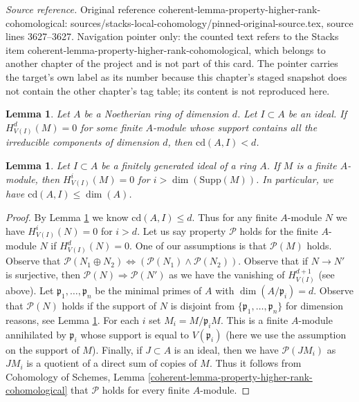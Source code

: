 \documentclass[10pt,a4paper]{amsart}
\theoremstyle{plain}
\newtheorem{lemma}[subsection]{Lemma}
\theoremstyle{definition}
\theoremstyle{remark}
\numberwithin{equation}{subsection}
\begin{document}
\noindent\textit{Source reference.} Original reference coherent-lemma-property-higher-rank-cohomological: sources/stacks-local-cohomology/pinned-original-source.tex, source lines 3627--3627. Navigation pointer only: the counted text refers to the Stacks item coherent-lemma-property-higher-rank-cohomological, which belongs to another chapter of the project and is not part of this card. The pointer carries the target's own label as its number because this chapter's staged snapshot does not contain the other chapter's tag table; its content is not reproduced here.\par\medskip
\begin{lemma}
\label{lemma-cd-top-vanishing-some-module}
Let $A$ be a Noetherian ring of dimension $d$. Let $I \subset A$
be an ideal. If $H^d_{V(I)}(M) = 0$ for some finite $A$-module
whose support contains all the irreducible components of
dimension $d$, then $\text{cd}(A, I) < d$.
\end{lemma}

\begin{lemma}
\label{lemma-cd-dimension}
Let $I \subset A$ be a finitely generated ideal of a ring $A$.
If $M$ is a finite $A$-module, then
$H^i_{V(I)}(M) = 0$ for $i > \dim(\text{Supp}(M))$.
In particular, we have $\text{cd}(A, I) \leq \dim(A)$.
\end{lemma}

\begin{proof}
By Lemma \ref{lemma-cd-dimension} we know $\text{cd}(A, I) \leq d$.
Thus for any finite $A$-module $N$ we have $H^i_{V(I)}(N) = 0$
for $i > d$. Let us say property $\mathcal{P}$ holds for the
finite $A$-module $N$ if $H^d_{V(I)}(N) = 0$.
One of our assumptions is that $\mathcal{P}(M)$ holds.
Observe that $\mathcal{P}(N_1 \oplus N_2)
\Leftrightarrow (\mathcal{P}(N_1) \wedge \mathcal{P}(N_2))$.
Observe that if $N \to N'$ is surjective, then
$\mathcal{P}(N) \Rightarrow \mathcal{P}(N')$ as we
have the vanishing of $H^{d + 1}_{V(I)}$ (see above).
Let $\mathfrak p_1, \ldots, \mathfrak p_n$ be the
minimal primes of $A$ with $\dim(A/\mathfrak p_i) = d$.
Observe that $\mathcal{P}(N)$ holds if the support
of $N$ is disjoint from $\{\mathfrak p_1, \ldots, \mathfrak p_n\}$
for dimension reasons, see Lemma \ref{lemma-cd-dimension}.
For each $i$ set $M_i = M/\mathfrak p_i M$.
This is a finite $A$-module annihilated by $\mathfrak p_i$
whose support is equal to
$V(\mathfrak p_i)$ (here we use the assumption on the support of $M$).
Finally, if $J \subset A$ is an ideal, then we have $\mathcal{P}(JM_i)$
as $JM_i$ is a quotient of a direct sum of copies of $M$.
Thus it follows from Cohomology of Schemes, Lemma
\ref{coherent-lemma-property-higher-rank-cohomological}
that $\mathcal{P}$ holds for every finite $A$-module.
\end{proof}
\end{document}
